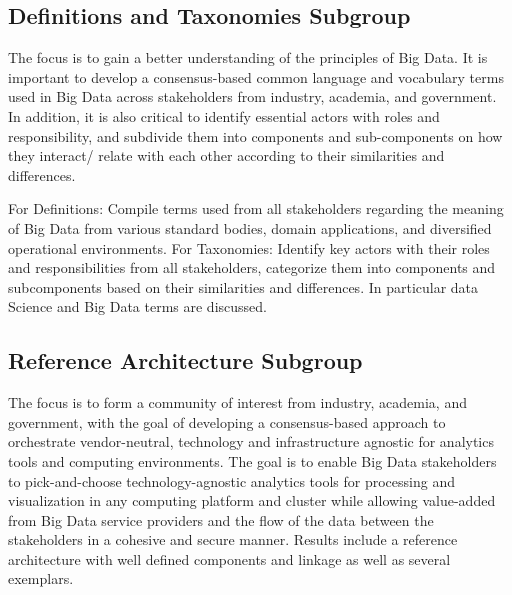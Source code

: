 


\subsection{Definitions and Taxonomies Subgroup}

The focus is to gain a better understanding of the principles of Big
Data. It is important to develop a consensus-based common language and
vocabulary terms used in Big Data across stakeholders from industry,
academia, and government. In addition, it is also critical to identify
essential actors with roles and responsibility, and subdivide them into
components and sub-components on how they interact/ relate with each
other according to their similarities and differences.

For Definitions: Compile terms used from all stakeholders regarding the
meaning of Big Data from various standard bodies, domain applications,
and diversified operational environments. For Taxonomies: Identify key
actors with their roles and responsibilities from all stakeholders,
categorize them into components and subcomponents based on their
similarities and differences. In particular data Science and Big Data
terms are discussed.




\subsection{Reference Architecture Subgroup}

The focus is to form a community of interest from industry, academia,
and government, with the goal of developing a consensus-based approach
to orchestrate vendor-neutral, technology and infrastructure agnostic
for analytics tools and computing environments. The goal is to enable
Big Data stakeholders to pick-and-choose technology-agnostic analytics
tools for processing and visualization in any computing platform and
cluster while allowing value-added from Big Data service providers and
the flow of the data between the stakeholders in a cohesive and secure
manner. Results include a reference architecture with well defined
components and linkage as well as several exemplars.




